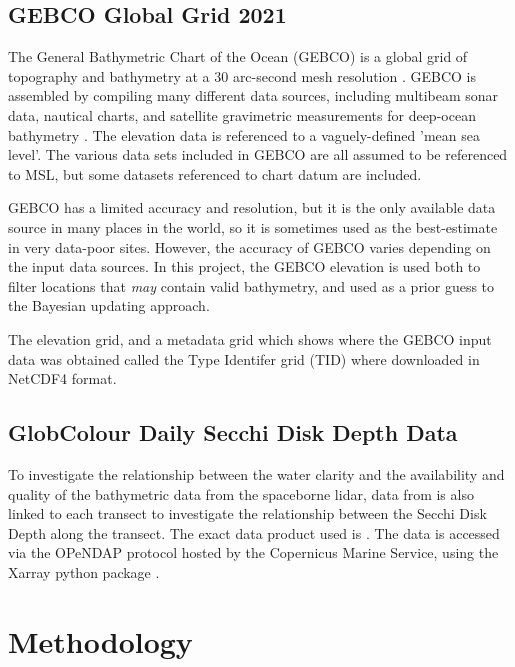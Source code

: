 \subsection{GEBCO Global Grid 2021}

The General Bathymetric Chart of the Ocean (GEBCO) is a global grid of topography and bathymetry at a 30 arc-second mesh resolution \parencite{gebco2021griddata}. GEBCO is assembled by compiling many different data sources, including multibeam sonar data, nautical charts, and satellite gravimetric measurements for deep-ocean bathymetry \parencite{gebcocookbook}. The elevation data is referenced to a vaguely-defined 'mean sea level'. The various data sets included in GEBCO are all assumed to be referenced to MSL, but some datasets referenced to chart datum are included. 

GEBCO has a limited accuracy and resolution, but it is the only available data source in many places in the world, so it is sometimes used as the best-estimate in very data-poor sites. However, the accuracy of GEBCO varies depending on the input data sources. In this project, the GEBCO elevation is used both to filter locations that \emph{may} contain valid bathymetry, and used as a prior guess to the Bayesian updating approach. 

The elevation grid, and a metadata grid which shows where the GEBCO input data was obtained called the Type Identifer grid (TID) where downloaded in NetCDF4 format.


\subsection{GlobColour Daily Secchi Disk Depth Data}

To investigate the relationship between the water clarity and the availability and quality of the bathymetric data from the spaceborne lidar, data from \citeauthor{Garnesson2019} is also linked to each transect to investigate the relationship between the Secchi Disk Depth along the transect. The exact data product used is \cite{Garnesson2019}. The data is accessed via the OPeNDAP protocol hosted by the Copernicus Marine Service, using the Xarray python package \parencite{hoyer_stephan_2022_6323468,hoyer2017xarray}.



\section{Methodology}

